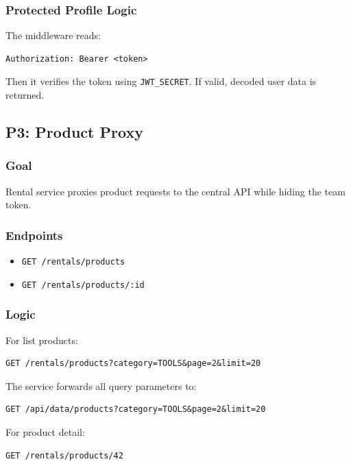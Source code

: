 \documentclass[11pt,a4paper]{article}
\begin{document}
\subsubsection*{Protected Profile Logic}

The middleware reads:

\begin{lstlisting}
Authorization: Bearer <token>
\end{lstlisting}

Then it verifies the token using \texttt{JWT\_SECRET}. If valid, decoded user data is returned.

\subsection{P3: Product Proxy}

\subsubsection*{Goal}
Rental service proxies product requests to the central API while hiding the team token.

\subsubsection*{Endpoints}

\begin{itemize}
  \item \texttt{GET /rentals/products}
  \item \texttt{GET /rentals/products/:id}
\end{itemize}

\subsubsection*{Logic}

For list products:

\begin{lstlisting}
GET /rentals/products?category=TOOLS&page=2&limit=20
\end{lstlisting}

The service forwards all query parameters to:

\begin{lstlisting}
GET /api/data/products?category=TOOLS&page=2&limit=20
\end{lstlisting}

For product detail:

\begin{lstlisting}
GET /rentals/products/42
\end{lstlisting}
\end{document}
